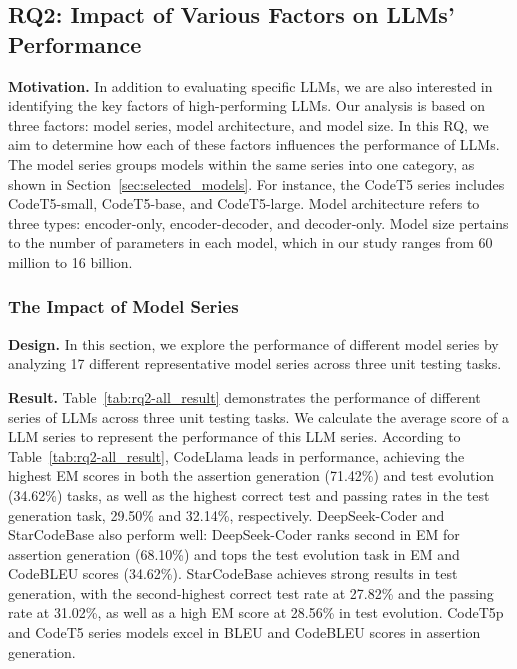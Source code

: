 \subsection{RQ2: Impact of Various Factors on LLMs' Performance}
\label{sec:rq2}

\textbf{Motivation.}
In addition to evaluating specific LLMs, we are also interested in identifying the key factors of high-performing LLMs. 
Our analysis is based on three factors: model series, model architecture, and model size. 
In this RQ, we aim to determine how each of these factors influences the performance of LLMs.
The model series groups models within the same series into one category, as shown in Section~\ref{sec:selected_models}. For instance, the CodeT5 series includes CodeT5-small, CodeT5-base, and CodeT5-large. Model architecture refers to three types: encoder-only, encoder-decoder, and decoder-only. Model size pertains to the number of parameters in each model, which in our study ranges from 60 million to 16 billion.




\subsubsection{The Impact of Model Series}

\textbf{Design.}
In this section, we explore the performance of different model series by analyzing 17 different representative model series across three unit testing tasks.



\textbf{Result.}
Table~\ref{tab:rq2-all_result} demonstrates the performance of different series of LLMs across three unit testing tasks. We calculate the average score of a LLM series to represent the performance of this LLM series. According to Table~\ref{tab:rq2-all_result}, CodeLlama leads in performance, achieving the highest EM scores in both the assertion generation (71.42\%) and test evolution (34.62\%) tasks, as well as the highest correct test and passing rates in the test generation task, 29.50\% and 32.14\%, respectively. DeepSeek-Coder and StarCodeBase also perform well: DeepSeek-Coder ranks second in EM for assertion generation (68.10\%) and tops the test evolution task in EM and CodeBLEU scores (34.62\%). StarCodeBase achieves strong results in test generation, with the second-highest correct test rate at 27.82\% and the passing rate at 31.02\%, as well as a high EM score at 28.56\% in test evolution. CodeT5p and CodeT5 series models excel in BLEU and CodeBLEU scores in assertion generation.

